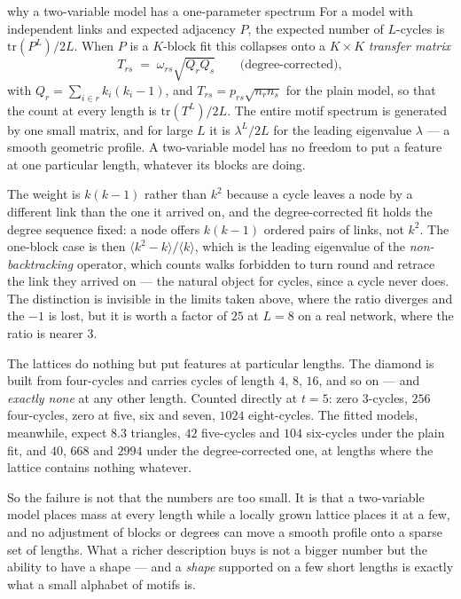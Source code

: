 \begin{calculation}{why a two-variable model has a one-parameter spectrum}
For a model with independent links and expected adjacency $P$, the expected number
of $L$-cycles is $\mathrm{tr}(P^L)/2L$. When $P$ is a $K$-block fit this collapses
onto a $K\times K$ \emph{transfer matrix}
\begin{equation}
  T_{rs} \;=\; \omega_{rs}\sqrt{Q_rQ_s}
  \qquad\text{(degree-corrected)},
  \label{eq:gr-transfer}
\end{equation}
with $Q_r=\sum_{i\in r}k_i(k_i-1)$, and $T_{rs}=p_{rs}\sqrt{n_rn_s}$ for the plain
model, so that the count at every length is $\mathrm{tr}(T^L)/2L$. The entire motif
spectrum is generated by one small matrix, and for large $L$ it is
$\lambda^L/2L$ for the leading eigenvalue $\lambda$ --- a smooth geometric profile.
A two-variable model has no freedom to put a feature at one particular length,
whatever its blocks are doing.

The weight is $k(k-1)$ rather than $k^2$ because a cycle leaves a node by a
different link than the one it arrived on, and the degree-corrected fit holds the
degree sequence fixed: a node offers $k(k-1)$ ordered pairs of links, not $k^2$.
The one-block case is then $\langle k^2-k\rangle/\langle k\rangle$, which is the
leading eigenvalue of the \emph{non-backtracking} operator, which counts walks
forbidden to turn round and retrace the link they arrived on --- the natural
object for cycles, since a cycle never does. The distinction is invisible in the
limits taken above, where the ratio diverges and the $-1$ is lost, but it is
worth a factor of $25$ at $L=8$ on a real network, where the ratio is nearer $3$.
\end{calculation}

The lattices do nothing but put features at particular lengths. The diamond is
built from four-cycles and carries cycles of length $4$, $8$, $16$, and so on ---
and \emph{exactly none} at any other length. Counted directly at $t=5$: zero
$3$-cycles, $256$ four-cycles, zero at five, six and seven, $1024$ eight-cycles.
The fitted models, meanwhile, expect $8.3$ triangles, $42$ five-cycles and $104$
six-cycles under the plain fit, and $40$, $668$ and $2994$ under the
degree-corrected one, at lengths where the lattice contains nothing whatever.

So the failure is not that the numbers are too small. It is that a two-variable
model places mass at every length while a locally grown lattice places it at a
few, and no adjustment of blocks or degrees can move a smooth profile onto a
sparse set of lengths. What a richer description buys is not a bigger number but
the ability to have a shape --- and a \emph{shape} supported on a few short
lengths is exactly what a small alphabet of motifs is.

